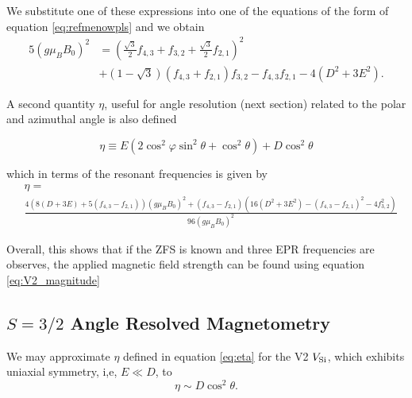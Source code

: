 We substitute one of these expressions into one of the equations of the form of equation \ref{eq:refmenowpls} and we obtain 
\begin{equation}
    \begin{align}
        5(g\mu_B B_0)^2 &=\left(\frac{\sqrt{3}}{2}f_{4,3} + f_{3,2}  + \frac{\sqrt{3}}{2}f_{2,1}\right)^2 \\ 
        &+(1 - \sqrt{3}) (f_{4,3} + f_{2,1})f_{3,2} - f_{4,3}f_{2,1} - 4(D^2 + 3E^2).
    \end{align}
    \label{eq:V2_magnitude}
\end{equation}

A second quantity $\eta$, useful for angle resolution (next section) related to the polar and azimuthal angle is also defined

\begin{equation}
        \eta \equiv E(2\cos^2\varphi \sin^2 \theta + \cos^2\theta) + D\cos^2 \theta 
    \label{eq:eta}
\end{equation}

which in terms of the resonant frequencies is given by 
\begin{equation}
    \begin{align}
    &\eta = \\ 
    &\frac{4\left(8(D + 3E) + 5(f_{4,3}-f_{2,1})\right)(g\mu_B B_0)^2 + (f_{4,3} - f_{2,1})\left(16(D^2 + 3E^2) - (f_{4,3}-f_{2,1})^2 - 4f_{3,2}^2\right)}{96(g\mu_B B_0)^2}
\end{align}
    \label{eq:eta_resonant}

\end{equation}


Overall, this shows that if the ZFS is known and three EPR frequencies are observes, the applied magnetic field strength can be found using equation \ref{eq:V2_magnitude}




\subsection{$S=3/2$ Angle Resolved Magnetometry}
We may approximate $\eta$ defined in equation \ref{eq:eta} for the V2 $V_{\ce{Si}}$, which exhibits uniaxial symmetry, i,e, $E\ll D$, to 
\begin{equation}
    \eta \sim D \cos^2 \theta. 
    \label{eq:}
\end{equation}

